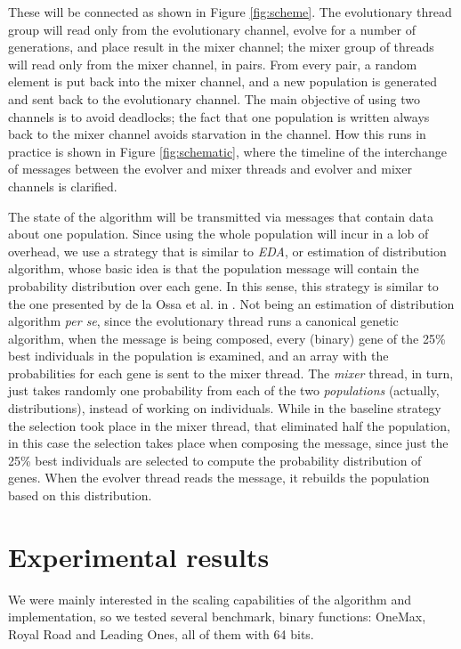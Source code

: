 \documentclass[sigconf]{acmart}\usepackage[]{graphicx}\usepackage[]{color}
\begin{document}
These will be connected as shown in Figure \ref{fig:scheme}. The
evolutionary thread group will read only from the evolutionary channel,
evolve for a number of generations, and place result in the mixer
channel; the mixer group of threads will read only from the mixer
channel, in pairs. From every pair, a random element is put back into
the mixer channel, and a new population is generated and sent back to
the evolutionary channel. The main objective of using two channels is
to avoid deadlocks; the fact that one population is written always
back to the mixer channel avoids starvation in the channel. How this
runs in practice is shown in Figure \ref{fig:schematic}, where the
timeline of the interchange of messages between the evolver and mixer
threads and evolver and mixer channels is clarified.

The state of the algorithm will be transmitted via messages that
contain data about one population. Since using the whole population
will incur in a lob of overhead, we use a strategy that is similar to {\em EDA}, or estimation of distribution
  algorithm, whose basic idea is that the population message will
  contain the probability distribution over each gene. In this sense,
  this strategy is similar to the one presented by de la Ossa et
  al. in \cite{10.1007/978-3-540-30217-9_25}. Not being an estimation
  of distribution algorithm {\em per se}, since the evolutionary
  thread runs a canonical genetic algorithm, when the message is being
  composed, every (binary) gene of the 25\% best individuals in the
  population is examined, and an array with the
  probabilities for each gene is sent to the mixer thread. The {\em
    mixer} thread, in turn, just takes randomly one probability from
  each of the two {\em populations} (actually, distributions), instead
  of working on individuals. While in the baseline strategy the
  selection took place in the mixer thread, that eliminated half the
  population, in this case the selection takes place when composing
  the message, since just the 25\% best individuals are selected to
  compute the probability distribution of genes. When the evolver
  thread reads the message, it rebuilds the population based on this
  distribution.

\section{Experimental results}
\label{sec:exp}

We were mainly interested in the scaling capabilities of the algorithm
and implementation, so we tested several benchmark, binary functions:
OneMax, Royal Road and Leading Ones, all of them with 64 bits. 
\end{document}
